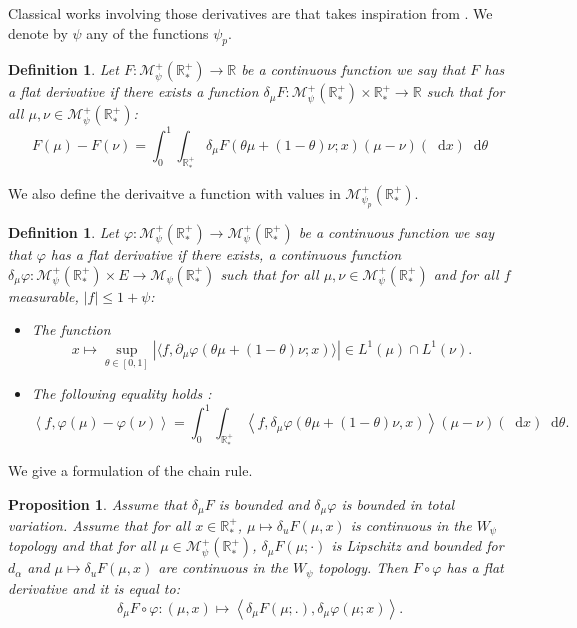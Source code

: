 \documentclass[11pt,a4paper]{article}
\newcommand{\RR}{\mathbb{R}}
\newcommand{\RRP}{\mathbb{R}^+_*}
\newcommand{\MC}{\mathcal{M}}
\newcommand{\brac}[1]{\left\langle#1\right\rangle}
\newcommand{\dd}{\mathop{}\!\mathrm{d}}
\newtheorem{proposition}[theorem]{Proposition}
\newtheorem{definition}[theorem]{Definition}
\begin{document}
Classical works involving those derivatives are \cite{martiniKolmogorovEquationsSpaces2023} that takes inspiration from \cite{cardaliaguet2019master,carmona2018probabilistic}. We denote by $\psi$ any of the functions $\psi_p$.
\begin{definition}
    Let $F: \MC^+_{\psi}(\RRP) \to \RR$ be a continuous function we say that $F$ has a flat derivative if there exists a function $\delta_{\mu}F :\MC^+_{\psi}(\RRP) \times \RRP \to \RR $ such that for all $\mu,\nu \in \MC^+_{\psi}(\RRP) $:
    \[ F(\mu) - F(\nu) = \int_0^1 \int_{\RRP} \delta_\mu F(\theta \mu + (1-\theta)\nu;x)\left(\mu - \nu\right)(\dd x)\dd \theta\]
\end{definition}
We also define the derivaitve a function with values in $\MC^+_{\psi_p}(\RRP) $.
\begin{definition}
     Let $\varphi: \MC^+_{\psi}(\RRP) \to \MC^+_{\psi}(\RRP)$ be a continuous function we say that $\varphi$ has a flat derivative if there exists, a continuous function $\delta_{\mu}\varphi :\MC^+_{\psi}(\RRP) \times E\to \MC_{\psi}(\RRP)$ such that for all $\mu,\nu \in \MC^+_{\psi}(\RRP)$ and for all $f$ measurable, $|f| \leq 1 + \psi$:
     \begin{itemize}
         \item The function
         \[x \mapsto \sup_{\theta \in [0,1]} |\langle f, \partial_\mu\varphi(\theta \mu + (1-\theta) \nu;x) \rangle| \in L^1(\mu) \cap L^1(\nu).\]
        \item The following equality holds :
            \[ \left\langle f,\varphi(\mu) - \varphi(\nu) \right\rangle= \int_0^1 \int_{\RRP} \left\langle f,\delta_\mu \varphi(\theta \mu + (1-\theta)\nu,x)\right\rangle\left(\mu - \nu\right)(\dd x)\dd \theta.\]
     \end{itemize}
\end{definition}
We give a formulation of the chain rule.
\begin{proposition}
    Assume that $\delta_\mu F$ is bounded and $\delta_\mu\varphi$ is bounded in total variation. Assume that for all \(x\in \RRP\), \(\mu \mapsto \delta_u F(\mu,x)\) is continuous in the $W_{\psi}$ topology and that for all $\mu \in \MC^+_{\psi}(\RRP)$, $\delta_\mu F(\mu;\cdot)$ is Lipschitz and bounded for $d_\alpha$ and \(\mu \mapsto \delta_u F(\mu,x)\) are continuous in the $W_{\psi}$ topology. Then \(F\circ \varphi\) has a flat derivative and it is equal to:
    \[
    \delta_\mu F\circ \varphi : \left(\mu,x \right) \mapsto \brac{\delta_\mu  F(\mu;.),\delta_\mu\varphi(\mu;x)}.
    \]
\end{proposition}
\end{document}
